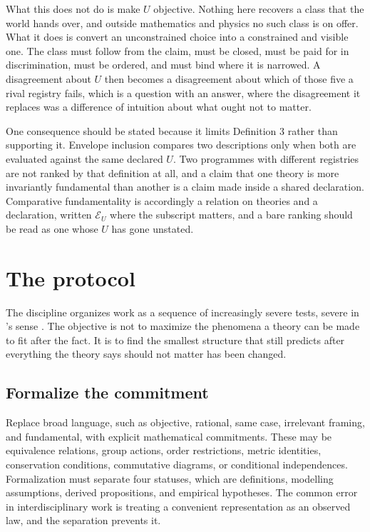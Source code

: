 \documentclass[11pt]{article}
\theoremstyle{remark}
\begin{document}
What this does not do is make $U$ objective. Nothing here recovers a class that
the world hands over, and outside mathematics and physics no such class is on
offer. What it does is convert an unconstrained choice into a constrained and
visible one. The class must follow from the claim, must be closed, must be paid
for in discrimination, must be ordered, and must bind where it is narrowed. A
disagreement about $U$ then becomes a disagreement about which of those five a
rival registry fails, which is a question with an answer, where the disagreement it
replaces was a difference of intuition about what ought not to matter.

One consequence should be stated because it limits Definition 3 rather than
supporting it. Envelope inclusion compares two descriptions only when both are
evaluated against the same declared $U$. Two programmes with different registries
are not ranked by that definition at all, and a claim that one theory is more
invariantly fundamental than another is a claim made inside a shared declaration.
Comparative fundamentality is accordingly a relation on theories and a
declaration, written $\mathcal{E}_U$ where the subscript matters, and a bare ranking
should be read as one whose $U$ has gone unstated.

\section{The protocol}

The discipline organizes work as a sequence of increasingly severe tests, severe in
\citeauthor{mayo2018}'s sense \citeyearpar{mayo2018}. The objective is not to
maximize the phenomena a theory can be made to fit after the fact. It is to find
the smallest structure that still predicts after everything the theory says should
not matter has been changed.

\subsection{Formalize the commitment}

Replace broad language, such as objective, rational, same case, irrelevant framing,
and fundamental, with explicit mathematical commitments. These may be equivalence
relations, group actions, order restrictions, metric identities, conservation
conditions, commutative diagrams, or conditional independences. Formalization must
separate four statuses, which are definitions, modelling assumptions, derived
propositions, and empirical hypotheses. The common error in interdisciplinary work
is treating a convenient representation as an observed law, and the separation
prevents it.
\end{document}
